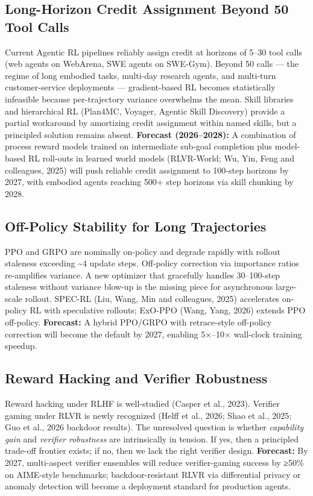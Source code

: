 \subsection{Long-Horizon Credit Assignment Beyond 50 Tool Calls}\label{long-horizon-credit-assignment-beyond-50-tool-calls}

Current Agentic RL pipelines reliably assign credit at horizons of 5--30 tool calls (web agents on WebArena, SWE agents on SWE-Gym). Beyond 50 calls --- the regime of long embodied tasks, multi-day research agents, and multi-turn customer-service deployments --- gradient-based RL becomes statistically infeasible because per-trajectory variance overwhelms the mean. Skill libraries and hierarchical RL (Plan4MC, Voyager, Agentic Skill Discovery) provide a partial workaround by amortizing credit assignment within named skills, but a principled solution remains absent. \textbf{Forecast (2026--2028):} A combination of process reward models trained on intermediate sub-goal completion plus model-based RL roll-outs in learned world models (RLVR-World; Wu, Yin, Feng and colleagues, 2025) will push reliable credit assignment to 100-step horizons by 2027, with embodied agents reaching 500+ step horizons via skill chunking by 2028.

\subsection{Off-Policy Stability for Long Trajectories}\label{off-policy-stability-for-long-trajectories}

PPO and GRPO are nominally on-policy and degrade rapidly with rollout staleness exceeding \textasciitilde4 update steps. Off-policy correction via importance ratios re-amplifies variance. A new optimizer that gracefully handles 30--100-step staleness without variance blow-up is the missing piece for asynchronous large-scale rollout. SPEC-RL (Liu, Wang, Min and colleagues, 2025) accelerates on-policy RL with speculative rollouts; ExO-PPO (Wang, Yang, 2026) extends PPO off-policy. \textbf{Forecast:} A hybrid PPO/GRPO with retrace-style off-policy correction will become the default by 2027, enabling 5×--10× wall-clock training speedup.

\subsection{Reward Hacking and Verifier Robustness}\label{reward-hacking-and-verifier-robustness}

Reward hacking under RLHF is well-studied (Casper et al., 2023). Verifier gaming under RLVR is newly recognized (Helff et al., 2026; Shao et al., 2025; Guo et al., 2026 backdoor results). The unresolved question is whether \emph{capability gain} and \emph{verifier robustness} are intrinsically in tension. If yes, then a principled trade-off frontier exists; if no, then we lack the right verifier design. \textbf{Forecast:} By 2027, multi-aspect verifier ensembles will reduce verifier-gaming success by ≥50\% on AIME-style benchmarks; backdoor-resistant RLVR via differential privacy or anomaly detection will become a deployment standard for production agents.

